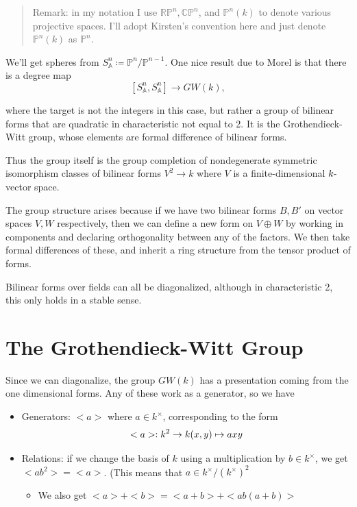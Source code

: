\documentclass[11pt]{scrreprt}
\theoremstyle{definition}
\providecommand{\tightlist}{%
  \setlength{\itemsep}{0pt}\setlength{\parskip}{0pt}}
\newcommand{\RP}[0]{{\mathbb{RP}}}
\newcommand{\CP}[0]{{\mathbb{CP}}}
\newcommand{\PP}[0]{{\mathbb{P}}}
\newcommand{\Af}[0]{{\mathbb{A}}}
\newcommand{\dash}[0]{{\hbox{-}}}
\newcommand{\definedas}[0]{\coloneqq}
\begin{document}
\begin{quote}
Remark: in my notation I use \(\RP^n, \CP^n\), and \(\PP^n(k)\) to
denote various projective spaces. I'll adopt Kirsten's convention here
and just denote \(\PP^n(k)\) as \(\PP^n\).
\end{quote}

We'll get spheres from \(S_\Af^n \definedas \PP^n/\PP^{n-1}\). One nice
result due to Morel is that there is a degree map \[
[S_\Af^n, S_\Af^n] \to GW(k),
\]

where the target is not the integers in this case, but rather a group of
bilinear forms that are quadratic in characteristic not equal to 2. It
is the Grothendieck-Witt group, whose elements are formal difference of
bilinear forms.

Thus the group itself is the group completion of nondegenerate symmetric
isomorphism classes of bilinear forms \(V^2 \to k\) where \(V\) is a
finite-dimensional \(k\dash\)vector space.

The group structure arises because if we have two bilinear forms
\(B, B'\) on vector spaces \(V, W\) respectively, then we can define a
new form on \(V \oplus W\) by working in components and declaring
orthogonality between any of the factors. We then take formal
differences of these, and inherit a ring structure from the tensor
product of forms.

Bilinear forms over fields can all be diagonalized, although in
characteristic 2, this only holds in a stable sense.

\hypertarget{the-grothendieck-witt-group}{%
\section{The Grothendieck-Witt
Group}\label{the-grothendieck-witt-group}}

Since we can diagonalize, the group \(GW(k)\) has a presentation coming
from the one dimensional forms. Any of these work as a generator, so we
have

\begin{itemize}
\tightlist
\item
  Generators: \(<a>\) where \(a\in k^\times\), corresponding to the form
  \[
  <a> : k^2 \to k\\
  (x,y) \mapsto axy
  \]
\item
  Relations: if we change the basis of \(k\) using a multiplication by
  \(b\in k^\times\), we get \(<ab^2>=<a>\). (This means that
  \(a \in k^\times/(k^\times)^2\)

  \begin{itemize}
  \tightlist
  \item
    We also get \(<a> + <b> = <a+b> + <ab(a+b)>\)
  \end{itemize}
\end{itemize}
\end{document}
